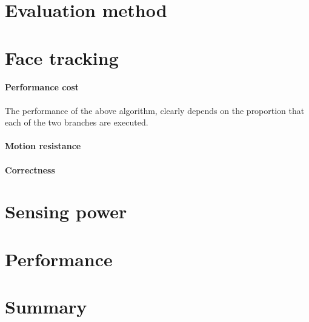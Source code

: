 \section{Evaluation method}
\section{Face tracking}
\label{section:face_tracking}
\paragraph{Performance cost}
The performance of the above algorithm, clearly depends on the proportion that each of the two branches are executed.
\paragraph{Motion resistance}

\paragraph{Correctness}
\section{Sensing power}
\section{Performance}
\section{Summary}